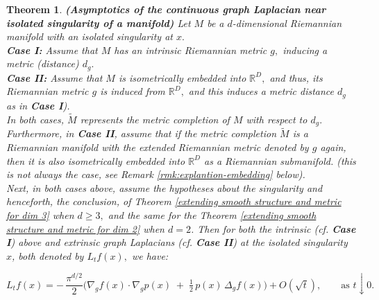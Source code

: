 \documentclass{amsart}
\newtheorem{theorem}{Theorem}[section]
\theoremstyle{definition}
\theoremstyle{remark}
\newcommand{\nd}{\noindent}
\newcommand{\Ddim}{\mathbb{R}^D}
\newcommand{\0}{\boldsymbol{0}}
\begin{document}
\begin{theorem}\label{thm:Asymptotics of Continuous graph Laplacian}\textbf{(Asymptotics of the continuous graph Laplacian near isolated singularity of a manifold)}
    Let $M$ be a $d$-dimensional Riemannian manifold with an isolated singularity at $x.$\\
    \textbf{Case I:} Assume that $M$ has an intrinsic Riemannian metric $g,$ inducing a metric (distance) $d_g.$\\
    \textbf{Case II:} Assume that $M$ is isometrically embedded into $\Ddim,$ and thus, its Riemannian metric $g$ is induced from $\Ddim,$ and this induces a metric distance $d_g$ as in \textbf{ Case I}).\\
    
    \nd In both cases, $\widetilde{M}$ represents the metric completion of $M$ with respect to $d_g.$\\
      
    \nd Furthermore, in \textbf{Case II}, assume that if the metric completion $\widetilde{M}$ is a Riemannian manifold with the extended Riemannian metric denoted by $g$ again, then it is \textit{also} isometrically embedded into $\Ddim$ as a Riemannian submanifold. \label{embedding-assumption} (this is not always the case, see Remark \ref{rmk:explantion-embedding} below).\\

    \nd Next, in both cases above, assume the hypotheses about the singularity and henceforth, the conclusion, of Theorem \ref{extending smooth structure and metric for dim 3} when $d\ge 3,$ and the same for the Theorem \ref{extending smooth structure and metric for dim 2} when $d=2$. Then for both the \textit{intrinsic} (cf. \textbf{Case I}) above and \textit{extrinsic} graph Laplacians (cf.\textbf{ Case II}) at the isolated singularity $x$, both denoted by $L_tf(x),$ we have:

\[
L_t f(x)= -\,\frac{\pi^{d/2}}{2}\Big(\nabla_g f(x)\!\cdot\!\nabla_g p(x)\;+\;\tfrac12\,p(x)\,\Delta_g f(x)\Big) + O(\sqrt{t}),
\qquad \text{as } t\downarrow 0.
\]


\end{theorem}
\end{document}

